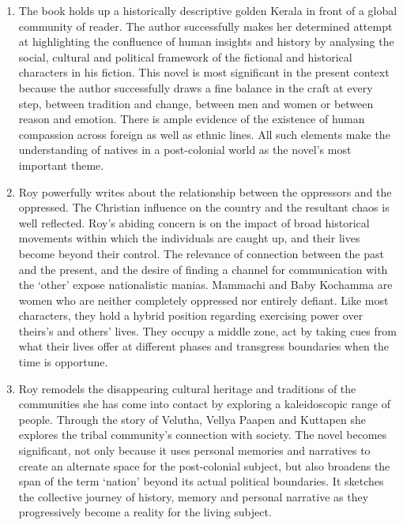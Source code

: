 \begin{enumerate}
  \item The book holds up a historically descriptive golden Kerala in front of a global community of reader.  The author successfully makes her determined attempt at highlighting the confluence of human insights and history by analysing the social, cultural and political framework of the fictional and historical characters in his fiction.  This novel is most significant in the present context because the author successfully draws a fine balance in the craft at every step, between tradition and change, between men and women or between reason and emotion.  There is ample evidence of the existence of human compassion across foreign as well as ethnic lines.  All such elements make the understanding of natives in a post-colonial world as the novel's most important theme.

  \item Roy powerfully writes about the relationship between the oppressors and the oppressed.  The Christian influence on the country and the resultant chaos is well reflected. Roy's abiding concern is on the impact of broad historical movements within which the individuals are caught up, and their lives become beyond their control. The relevance of connection between the past and the present, and the desire of finding a channel for communication with the `other' expose nationalistic manias. Mammachi and Baby Kochamma are women who are neither completely oppressed nor entirely defiant. Like most characters, they hold a hybrid position regarding exercising power over theirs's and others' lives. They occupy a middle zone, act by taking cues from what their lives offer at different phases and transgress boundaries when the time is opportune.

  \item Roy remodels the disappearing cultural heritage and traditions of the communities she has come into contact by exploring a kaleidoscopic range of people.  Through the story of Velutha, Vellya Paapen and Kuttapen she explores the tribal community's connection with society.  The novel becomes significant, not only because it uses personal memories and narratives to create an alternate space for the post-colonial subject, but also broadens the span of the term `nation' beyond its actual political boundaries.  It sketches the collective journey of history, memory and personal narrative as they progressively become a reality for the living subject.


\end{enumerate}
